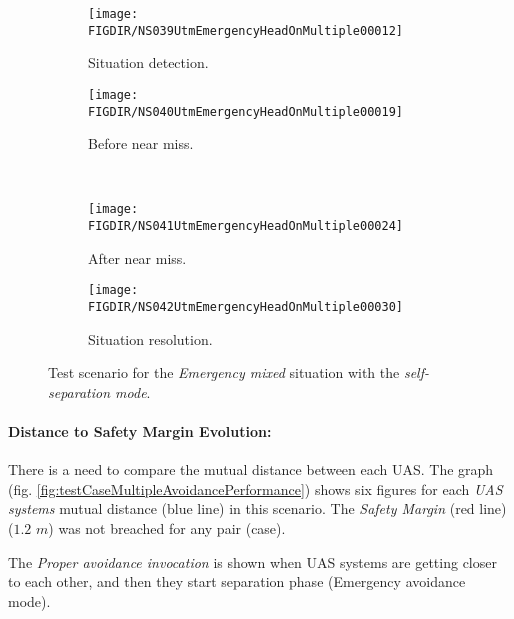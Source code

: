     \begin{figure}[H]
        \centering
        \begin{subfigure}{0.48\textwidth}
        	\centering
            \texttt{[image: \\FIGDIR/NS039UtmEmergencyHeadOnMultiple00012]}
            \caption{Situation detection.}
            \label{fig:emergencyMultipleSituationDetection}
        \end{subfigure}
        \begin{subfigure}{0.48\textwidth}
        	\centering
            \texttt{[image: \\FIGDIR/NS040UtmEmergencyHeadOnMultiple00019]} 
            \caption{Before near miss.}
            \label{fig:emergencyMultipleBeforeNearMiss}
        \end{subfigure}
        \\
        \begin{subfigure}{0.48\textwidth}
        	\centering
            \texttt{[image: \\FIGDIR/NS041UtmEmergencyHeadOnMultiple00024]} 
            \caption{After near miss.}
            \label{fig:emergencyMultipleAfterNearMiss}
        \end{subfigure}
        \begin{subfigure}{0.48\textwidth}
        	\centering
            \texttt{[image: \\FIGDIR/NS042UtmEmergencyHeadOnMultiple00030]} 
            \caption{Situation resolution.}
            \label{fig:emergencyMultipleSituationReslution}
        \end{subfigure}
        \caption{Test scenario for the \emph{Emergency mixed} situation with the \emph{self-separation mode}.}
        \label{fig:testCaseEmergencyMixed}
    \end{figure}
    
    \paragraph{Distance to Safety Margin Evolution:} There is a need to compare the mutual distance between each UAS. The graph (fig. \ref{fig:testCaseMultipleAvoidancePerformance}) shows six figures for each \emph{UAS systems} mutual distance (blue line) in this scenario. The \emph{Safety Margin} (red line) ($1.2$ $m$) was not breached for any pair (case). 
    
    The \emph{Proper avoidance invocation} is shown when UAS systems are getting closer to each other, and then they start separation phase (Emergency avoidance mode).
            
